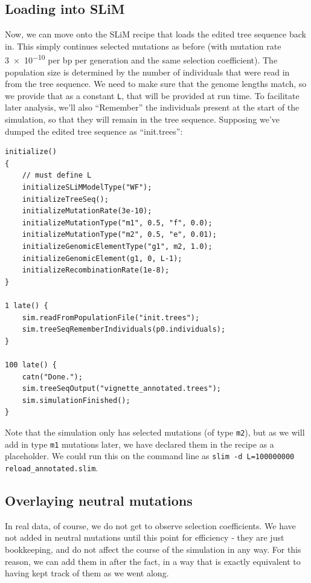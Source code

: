 \documentclass[12pt]{article}
\begin{document}
\subsection*{Loading into SLiM}

Now, we can move onto the SLiM recipe
that loads the edited tree sequence back in.
This simply continues selected mutations as before
(with mutation rate \num{3e-10} per bp per generation and the same selection coefficient).
The population size is determined by the number of individuals
that were read in from the tree sequence.
We need to make sure that the genome lengths match,
so we provide that as a constant \verb|L|, that will be provided at run time.
To facilitate later analysis,
we’ll also ``Remember'' the individuals present at the start of the simulation,
so that they will remain in the tree sequence.
Supposing we've dumped the edited tree sequence as ``init.trees'':
\begin{verbatim}
initialize()
{
    // must define L
    initializeSLiMModelType("WF");
    initializeTreeSeq();
    initializeMutationRate(3e-10);
    initializeMutationType("m1", 0.5, "f", 0.0);
    initializeMutationType("m2", 0.5, "e", 0.01);
    initializeGenomicElementType("g1", m2, 1.0);
    initializeGenomicElement(g1, 0, L-1);
    initializeRecombinationRate(1e-8);
}

1 late() { 
    sim.readFromPopulationFile("init.trees");
    sim.treeSeqRememberIndividuals(p0.individuals);
}

100 late() {
    catn("Done.");
    sim.treeSeqOutput("vignette_annotated.trees");
    sim.simulationFinished();
}
\end{verbatim}

Note that the simulation only has selected mutations (of type \verb|m2|),
but as we will add in type \verb|m1| mutations later,
we have declared them in the recipe as a placeholder.
We could run this on the command line as \verb|slim -d L=100000000 reload_annotated.slim|.


\subsection*{Overlaying neutral mutations}

In real data, of course, we do not get to observe selection coefficients.
We have not added in neutral mutations until this point for efficiency - they are just bookkeeping,
and do not affect the course of the simulation in any way.
For this reason, we can add them in after the fact,
in a way that is exactly equivalent to having kept track of them as we went along.
\end{document}
